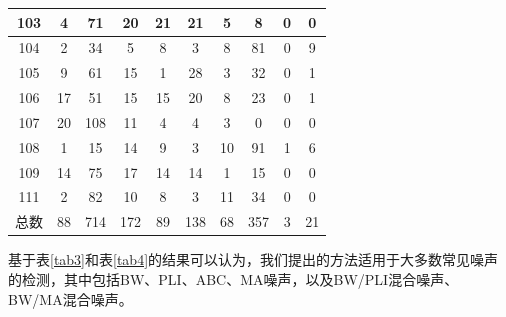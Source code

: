 \begin{table}[htbp]
\begin{tabular}{|c|c|c|c|c|c|c|c|c|c|}
\hline 
103 & 4 & 71 & 20 & 21 & 21 & 5 & 8 & 0 & 0 \\ 
\hline 
104 & 2 & 34 & 5 & 8 & 3 & 8 & 81 & 0 & 9 \\ 
\hline 
105 & 9 & 61 & 15 & 1 & 28 & 3 & 32 & 0 & 1 \\ 
\hline 
106 & 17 & 51 & 15 & 15 & 20 & 8 & 23 & 0 & 1 \\ 
\hline 
107 & 20 & 108 & 11 & 4 & 4 & 3 & 0 & 0 & 0 \\ 
\hline 
108 & 1 & 15 & 14 & 9 & 3 & 10 & 91 & 1 & 6 \\ 
\hline 
109 & 14 & 75 & 17 & 14 & 14 & 1 & 15 & 0 & 0 \\ 
\hline 
111 & 2 & 82 & 10 & 8 & 3 & 11 & 34 & 0 & 0 \\ 
\hline 
总数 & 88 & 714 & 172 & 89 & 138 & 68 & 357 & 3 & 21 \\ 
\hline 
\end{tabular} 
\end{table}
基于表\ref{tab3}和表\ref{tab4}的结果可以认为，我们提出的方法适用于大多数常见噪声的检测，其中包括BW、PLI、ABC、MA噪声，以及BW/PLI混合噪声、BW/MA混合噪声。

